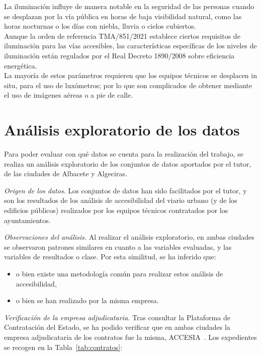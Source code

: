 La iluminación influye de manera notable en la seguridad de las personas cuando se desplazan por la vía pública en horas de baja visibilidad natural, como las horas nocturnas o los días con niebla, lluvia o cielos cubiertos.
\\

Aunque la orden de referencia TMA/851/2021 establece ciertos requisitos de iluminación para las vías accesibles, las características específicas de los niveles de iluminación están regulados por el Real Decreto 1890/2008 sobre eficiencia energética.
\\

La mayoría de estos parámetros requieren que los equipos técnicos se desplacen in situ, para el uso de luxómetros; por lo que son complicados de obtener mediante el uso de imágenes aéreas o a pie de calle.
\\



\section{Análisis exploratorio de los datos}
\label{sec:analisis-exploratorio}

Para poder evaluar con qué datos se cuenta para la realización del trabajo, se realiza un análisis exploratorio de los conjuntos de datos aportados por el tutor, de las ciudades de Albacete y Algeciras.

\medskip
\noindent\textit{Origen de los datos.} Los conjuntos de datos han sido facilitados por el tutor, y son los resultados de los análisis de accesibilidad del viario urbano (y de los edificios públicos) realizados por los equipos técnicos contratados por los ayuntamientos.

\medskip
\noindent\textit{Observaciones del análisis.} Al realizar el análisis exploratorio, en ambas ciudades se observaron patrones similares en cuanto a las variables evaluadas, y las variables de resultados o clase. Por esta similitud, se ha inferido que:
\begin{itemize}
  \item o bien existe una metodología común para realizar estos análisis de accesibilidad,
  \item o bien se han realizado por la misma empresa.
\end{itemize}

\medskip
\noindent\textit{Verificación de la empresa adjudicataria.} Tras consultar la Plataforma de Contratación del Estado, se ha podido verificar que en ambas ciudades la empresa adjudicataria de los contratos fue la misma, ACCESIA~\parencite{contrato_albacete_2021,contrato_algeciras_2025}. Los expedientes se recogen en la Tabla~\ref{tab:contratos}:

